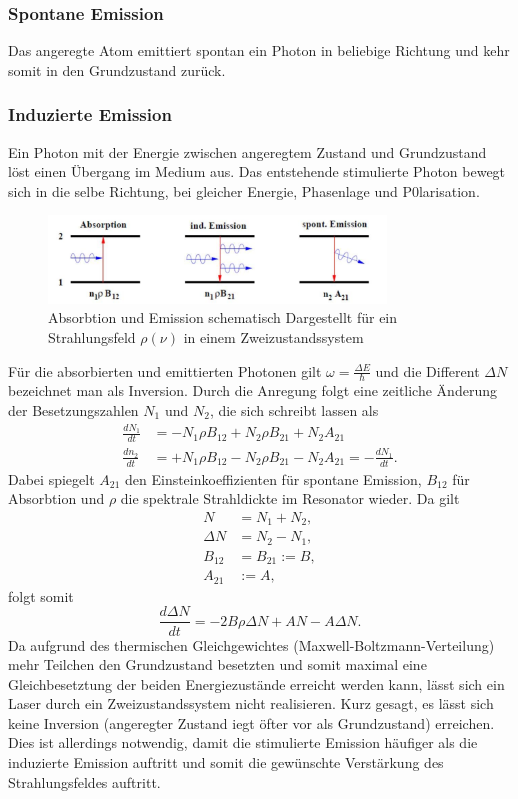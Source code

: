 \subsubsection*{Spontane Emission}
Das angeregte Atom emittiert spontan ein Photon in beliebige Richtung und kehr somit in den Grundzustand zurück.
\subsubsection*{Induzierte Emission}
Ein Photon mit der Energie zwischen angeregtem Zustand und Grundzustand löst einen Übergang im Medium aus. Das entstehende stimulierte Photon
bewegt sich in die selbe Richtung, bei gleicher Energie, Phasenlage und P0larisation.

\begin{figure}
    \center
    \includegraphics[width=0.8\textwidth]{bilder/3wege.jpg}
    \caption{Absorbtion und Emission schematisch Dargestellt für ein Strahlungsfeld $\rho(\nu)$ in einem Zweizustandssystem \cite{anleitung}}
    \label{fig:3wege}
\end{figure}
\label{sec:theorie}

Für die absorbierten und emittierten Photonen gilt $\omega=\frac{\Delta E}{\hbar}$ und die Different $\Delta N$ bezeichnet man als Inversion.
Durch die Anregung folgt eine zeitliche Änderung der Besetzungszahlen $N_1$ und $N_2$, die sich schreibt lassen als
\begin{align}
    \frac{dN_1}{dt}&=-N_1\rho B_{12}+N_2\rho B_{21} + N_2 A_{21}\\
    \frac{dn_2}{dt}&=+N_1\rho B_{12}-N_2\rho B_{21} - N_2 A_{21}= -\frac{dN_1}{dt}.
\end{align}
Dabei spiegelt $A_{21}$ den Einsteinkoeffizienten für spontane Emission, $B_{12}$ für Absorbtion und $\rho$ die spektrale Strahldickte im Resonator wieder.
Da gilt
\begin{align}
    N&=N_1+N_2{,}\\
    \Delta N &= N_2-N_1{,}\\
    B_{12}&=B_{21}:=B{,}\\
    A_{21}&:=A{,}   
\end{align}
folgt somit
\begin{equation}
    \frac{d\Delta N}{dt}=-2B\rho\Delta N + AN-A\Delta N.
\end{equation}
Da aufgrund des thermischen Gleichgewichtes (Maxwell-Boltzmann-Verteilung) mehr Teilchen den Grundzustand besetzten und somit maximal eine 
Gleichbesetztung der beiden Energiezustände erreicht werden kann, lässt sich ein Laser durch ein Zweizustandssystem nicht realisieren. Kurz gesagt,
es lässt sich keine Inversion (angeregter Zustand iegt öfter vor als Grundzustand) erreichen.
Dies ist allerdings notwendig, damit die stimulierte Emission häufiger als die induzierte Emission auftritt und somit die gewünschte Verstärkung des Strahlungsfeldes auftritt.

